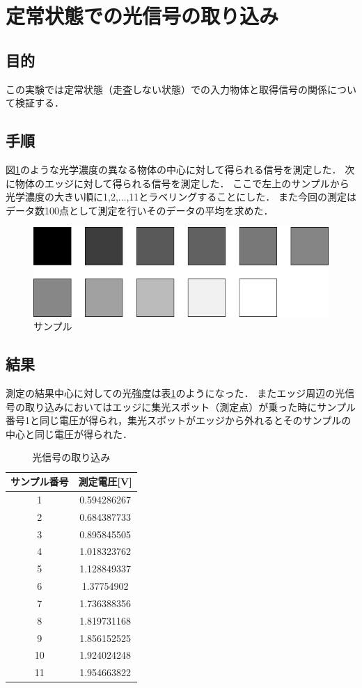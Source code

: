 \documentclass[11pt, a4paper,twocolumn]{jarticle}
\begin{document}
\section{定常状態での光信号の取り込み}
\subsection{目的}
この実験では定常状態（走査しない状態）での入力物体と取得信号の関係について検証する．

\subsection{手順}
図\ref{fig:5}のような光学濃度の異なる物体の中心に対して得られる信号を測定した．
次に物体のエッジに対して得られる信号を測定した．
ここで左上のサンプルから光学濃度の大きい順に1,2,...,11とラベリングすることにした．
また今回の測定はデータ数100点として測定を行いそのデータの平均を求めた．
\begin{figure}[ht]
 \begin{center}
  \includegraphics[width=0.8\linewidth]{fig5.png}
 \end{center}
 \caption{サンプル}
 \label{fig:5}
\end{figure}

\subsection{結果}
測定の結果中心に対しての光強度は表\ref{fig:hoge}のようになった．
またエッジ周辺の光信号の取り込みにおいてはエッジに集光スポット（測定点）が乗った時にサンプル番号1と同じ電圧が得られ，集光スポットがエッジから外れるとそのサンプルの中心と同じ電圧が得られた．

\begin{table}[ht]
\centering
\caption{光信号の取り込み}
\label{my-label}
\begin{tabular}{c c}
\hline
サンプル番号 & 測定電圧[V] \\ \hline
1 & 0.594286267 \\
2 & 0.684387733 \\
3 & 0.895845505 \\
4 & 1.018323762 \\
5 & 1.128849337 \\
6 & 1.37754902 \\
7 & 1.736388356 \\
8 & 1.819731168 \\
9 & 1.856152525 \\
10 & 1.924024248 \\
11 & 1.954663822\\
\end{tabular}
\label{fig:hoge}
\end{table}
\end{document}
